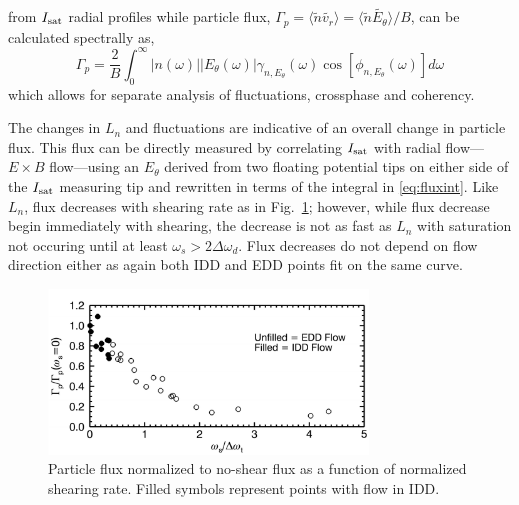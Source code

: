 \documentclass[aps,prl,amsmath,amssymb,preprint,superscriptaddress]{revtex4}
\begin{document}
 from $I_{\rm sat}$ radial profiles while particle flux, $\Gamma_{p} = \langle \tilde{n} \tilde{v_{r}} \rangle = \langle \tilde{n} \tilde{E_{\theta}} \rangle /B$, can be calculated spectrally as\cite{powers74}, 
\begin{equation}
\Gamma_{p} = \frac{2}{B} \int^{\infty}_{0} \lvert n(\omega) \rvert \lvert E_{\theta}(\omega) \rvert \gamma_{n,E_{\theta}}(\omega) \cos [\phi_{n,E_{\theta}}(\omega)] d\omega
\label{eq:fluxint}
\end{equation}
which allows for separate analysis of fluctuations, crossphase and coherency.




The changes in $L_{n}$ and fluctuations are indicative of an overall change in particle flux. This flux can be directly measured by correlating $I_{\rm sat}$ with radial flow---$E \times B$ flow---using an $E_{\theta}$ derived from two floating potential tips on either side of the $I_{\rm sat}$ measuring tip and rewritten in terms of the integral in \eqref{eq:fluxint}. Like $L_{n}$, flux decreases with shearing rate as in Fig.~\ref{fig:fluxvsshear}; however, while flux decrease begin immediately with shearing, the decrease is not as fast as $L_{n}$ with saturation not occuring until at least $\omega_{s} > 2\Delta \omega_{d}$. Flux decreases do not depend on flow direction either as again both IDD and EDD points fit on the same curve.

\begin{figure}
\begin{center}
\includegraphics[width=8.5cm]{fluxvsshear.pdf}%
\caption{\label{fig:fluxvsshear} Particle flux normalized to no-shear flux as a function of normalized shearing rate. Filled symbols represent points with flow in IDD.}
\end{center}
\end{figure}

\end{document}
